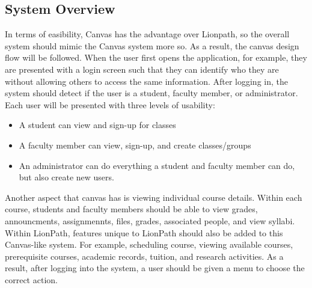 \documentclass{article}
\begin{document}
  \subsection{System Overview}\label{sec:Requirements:System}
    In terms of easibility, Canvas has the advantage over Lionpath, so the overall system should mimic the Canvas system more so.  As a result, the canvas design flow will be followed.  When the user first opens the application, for example, they are presented with a login screen such that they can identify who they are without allowing others to access the same information.  After logging in, the system should detect if the user is a student, faculty member, or administrator.
    \newline\newline
    Each user will be presented with three levels of usability:
    \begin{itemize}
      \item A student can view and sign-up for classes
      \item A faculty member can view, sign-up, and create classes/groups
      \item An administrator can do everything a student and faculty member can do, but also create new users.
    \end{itemize}
    Another aspect that canvas has is viewing individual course details.  Within each course, students and faculty members should be able to view grades, announcments, assignmennts, files, grades, associated people, and view syllabi.
    \newline\newline
    Within LionPath, features unique to LionPath should also be added to this Canvas-like system.  For example, scheduling course, viewing available courses, prerequisite courses, academic records, tuition, and research activities.  As a result, after logging into the system, a user should be given a menu to choose the correct action.
\end{document}
